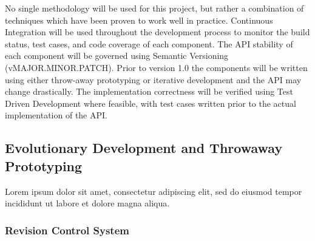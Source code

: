 \documentclass[12pt, a4paper]{article}
\begin{document}
No single methodology will be used for this project, but rather a combination of techniques which have been proven to work well in practice. Continuous Integration will be used throughout the development process to monitor the build status, test cases, and code coverage of each component. The API stability of each component will be governed using Semantic Versioning (vMAJOR.MINOR.PATCH). Prior to version 1.0 the components will be written using either throw-away prototyping or iterative development and the API may change drastically. The implementation correctness will be verified using Test Driven Development where feasible, with test cases written prior to the actual implementation of the API.





\subsection{Evolutionary Development and Throwaway Prototyping}

Lorem ipsum dolor sit amet, consectetur adipiscing elit, sed do eiusmod tempor incididunt ut labore et dolore magna aliqua.


\subsubsection{Revision Control System}
\end{document}
